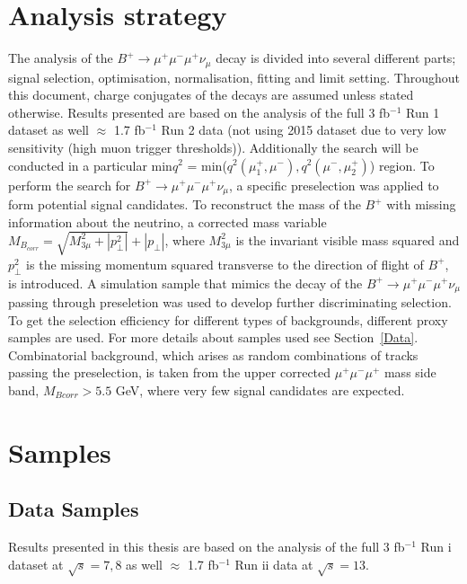 \section{Analysis strategy}
\label{Strategy}

The analysis of the $B^{+} \rightarrow \mu^{+} \mu^{-} \mu^{+} \nu_\mu$ decay is divided into several different parts; signal selection, optimisation, normalisation, fitting and limit setting. Throughout this document, charge conjugates of the decays are assumed unless stated otherwise. Results presented are based on the analysis of the full 3 fb$^{-1}$ Run 1 dataset as well $\approx$ 1.7 fb$^{-1}$ Run 2 data (not using 2015 dataset due to very low sensitivity (high muon trigger thresholds)). Additionally the search will be conducted in a particular min$q^{2}$ = min($q^{2}(\mu_{1}^{+},\mu^{-}), q^2(\mu^{-},\mu_{2}^{+})$) region.
\newline To perform the search for $B^{+} \rightarrow \mu^{+} \mu^{-} \mu^{+} \nu_\mu$, a specific preselection was applied to form potential signal candidates. To reconstruct the mass of the $B^{+}$ with missing information about the neutrino, a corrected mass variable $M_{B_{corr}} = \sqrt{M_{3\mu}^{2} + |p^{2}_{\perp}|} + |p_{\perp}|$, where $M_{3\mu}^{2}$ is the invariant visible mass squared and $p^{2}_{\perp}$ is the missing momentum squared transverse to the direction of flight of $B^{+}$, is introduced. A simulation sample that mimics the decay of the $B^{+} \rightarrow \mu^{+} \mu^{-} \mu^{+} \nu_\mu$ passing through preseletion was used to develop further discriminating selection. To get the selection efficiency for different types of backgrounds, different proxy samples are used. For more details about samples used see Section~\ref{Data}.
\newline Combinatorial background, which arises as random combinations of tracks passing the preselection, is taken from the upper corrected $\mu^{+} \mu^{-} \mu^{+}$ mass side band, $M_{Bcorr} > 5.5$ GeV, where very few signal candidates are expected.


\section{Samples}
\subsection{Data Samples}
Results presented in this thesis are based on the analysis of the full 3 fb$^{-1}$ Run \Rn{1} dataset at $\sqrt{s}={7},{8}$ \tev as well $\approx$ 1.7 fb$^{-1}$ Run \Rn{2} data at $\sqrt{s}=13$\tev.

